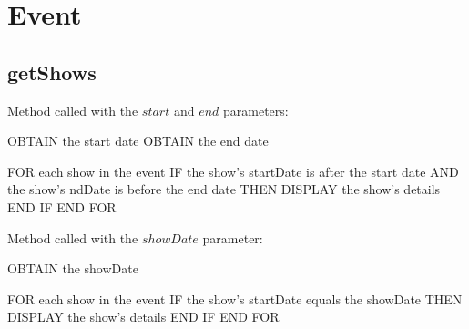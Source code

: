 \section{Event}

\subsection{getShows}
Method called with the $start$ and $end$ parameters:
\begin{pc}
OBTAIN the start date
OBTAIN the end date

FOR each show in the event
    IF the show's startDate is after the start date AND the show's ndDate is before the end date    THEN
        DISPLAY the show's details
    END IF
END FOR
\end{pc}

Method called with the $showDate$ parameter:
\begin{pc}
OBTAIN the showDate

FOR each show in the event
    IF the show's startDate equals the showDate THEN
	    DISPLAY the show's details
    END IF
END FOR
\end{pc}
